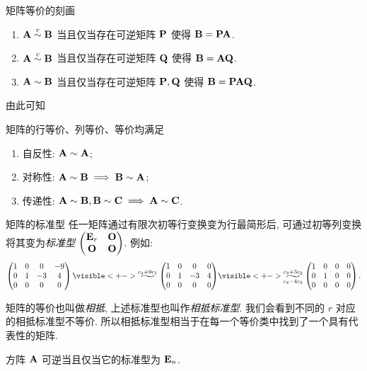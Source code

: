 \begin{frame}{矩阵等价的刻画}
	\onslide<+->
	\begin{theorem}
		\begin{enumerate}
			\item ${\mathbf{A}}\mathrel{\overset{r}{\sim}}{\mathbf{B}}$ 当且仅当存在可逆矩阵 ${\mathbf{P}}$ 使得 ${\mathbf{B}}={\mathbf{P}}{\mathbf{A}}$.
			\item ${\mathbf{A}}\mathrel{\overset{c}{\sim}}{\mathbf{B}}$ 当且仅当存在可逆矩阵 ${\mathbf{Q}}$ 使得 ${\mathbf{B}}={\mathbf{A}}{\mathbf{Q}}$.
			\item ${\mathbf{A}}\sim{\mathbf{B}}$ 当且仅当存在可逆矩阵 ${\mathbf{P}},{\mathbf{Q}}$ 使得 ${\mathbf{B}}={\mathbf{P}}{\mathbf{A}}{\mathbf{Q}}$.
		\end{enumerate}
	\end{theorem}
	\onslide<+->
	由此可知
	\begin{proposition}
		矩阵的行等价、列等价、等价均满足
		\begin{enumerate}
			\item 自反性: ${\mathbf{A}}\sim{\mathbf{A}}$;
			\item 对称性: ${\mathbf{A}}\sim{\mathbf{B}}\implies{\mathbf{B}}\sim{\mathbf{A}}$;
			\item 传递性: ${\mathbf{A}}\sim{\mathbf{B}},{\mathbf{B}}\sim{\mathbf{C}}\implies{\mathbf{A}}\sim{\mathbf{C}}$.
		\end{enumerate}
	\end{proposition}
\end{frame}


\begin{frame}{矩阵的标准型}
	\onslide<+->
	任一矩阵通过有限次初等行变换变为行最简形后, 可通过初等列变换将其变为\emph{标准型} $\begin{pmatrix}
		{\mathbf{E}}_r&{\mathbf{O}}\\{\mathbf{O}}&{\mathbf{O}}
	\end{pmatrix}$.
	\onslide<+->
	例如:
	\[\begin{pmatrix}
		1&0&0&-9\\
		0&1&-3&4\\
		0&0&0&0
	\end{pmatrix}\visible<+->{\wsim{c_4+9c_1}{}\begin{pmatrix}
		1&0&0&0\\
		0&1&-3&4\\
		0&0&0&0
	\end{pmatrix}}
	\visible<+->{\wsim{c_3+3c_2}{c_4-4c_2}\begin{pmatrix}
		1&0&0&0\\
		0&1&0&0\\
		0&0&0&0
	\end{pmatrix}.}\]

	\onslide<+->
	矩阵的等价也叫做\emph{相抵}, 上述标准型也叫作\emph{相抵标准型}.
	\onslide<+->
	我们会看到不同的 $r$ 对应的相抵标准型不等价.
	\onslide<+->
	所以相抵标准型相当于在每一个等价类中找到了一个具有代表性的矩阵.

	\onslide<+->
	\begin{proposition}
		方阵 ${\mathbf{A}}$ 可逆当且仅当它的标准型为 ${\mathbf{E}}_n$.
	\end{proposition}
\end{frame}


